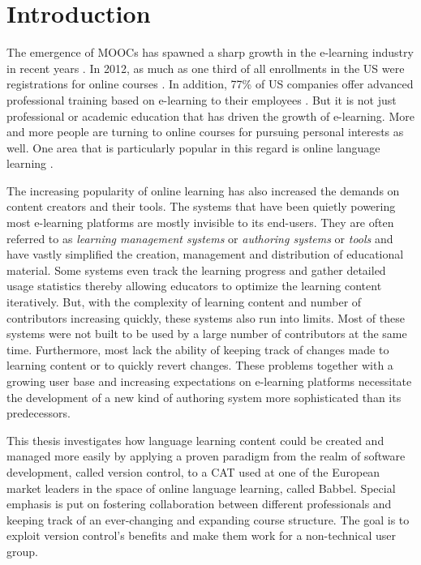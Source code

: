 \chapter{Introduction}
The emergence of \ac{MOOCs} has spawned a sharp growth in the e-learning industry in recent years \cite{_e-learning_2014}. In 2012, as much as one third of all enrollments in the US were registrations for online courses \cite{allen_grade_2014}. In addition, 77\% of US companies offer advanced professional training based on e-learning to their employees \cite{vernau_corporate_2014}. But it is not just professional or academic education that has driven the growth of e-learning. More and more people are turning to online courses for pursuing personal interests as well. One area that is particularly popular in this regard is online language learning \cite{blake_current_2011,_its_2014}.



The increasing popularity of online learning has also increased the demands on content creators and their tools. The systems that have been quietly powering most e-learning platforms are mostly invisible to its end-users. They are often referred to as \textit{learning management systems} or \textit{authoring systems} or \textit{tools} and have vastly simplified the creation, management and distribution of educational material. Some systems even track the learning progress and gather detailed usage statistics thereby allowing educators to optimize the learning content iteratively. But, with the complexity of learning content and number of contributors increasing quickly, these systems also run into limits. Most of these systems were not built to be used by a large number of contributors at the same time. Furthermore, most lack the ability of keeping track of changes made to learning content or to quickly revert changes. These problems together with a growing user base and increasing expectations on e-learning platforms necessitate the development of a new kind of authoring system more sophisticated than its predecessors.

This thesis investigates how language learning content could be created and managed more easily by applying a proven paradigm from the realm of software development, called version control, to a \ac{CAT} used at one of the European market leaders in the space of online language learning, called Babbel. Special emphasis is put on fostering collaboration between different professionals and keeping track of an ever-changing and expanding course structure. The goal is to exploit version control's benefits and make them work for a non-technical user group.

